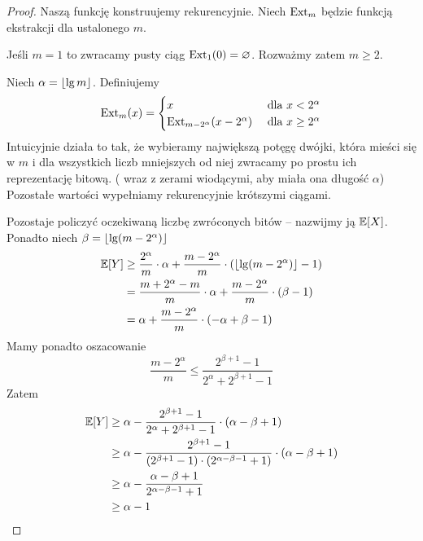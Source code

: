\begin{proof}
	Naszą funkcję konstruujemy rekurencyjnie. Niech \( \operatorname{Ext}_m \) będzie funkcją ekstrakcji dla ustalonego \( m \).

	Jeśli \( m = 1 \) to zwracamy pusty ciąg \( \operatorname{Ext}_1(0) = \varnothing \).
	Rozważmy zatem \( m \geq 2 \).

	Niech \( \alpha = \left\lfloor\lg m\right\rfloor \). Definiujemy
	\[
		\operatorname{Ext}_m(x) = \begin{cases}
			x                                 & \text{ dla } x < 2^\alpha    \\
			\operatorname{Ext}_{m - 2^\alpha}(x - 2^\alpha) & \text{ dla } x \geq 2^\alpha
		\end{cases}
	\]
	Intuicyjnie działa to tak, że wybieramy największą potęgę dwójki, która mieści się w \( m \)
	i dla wszystkich liczb mniejszych od niej zwracamy po prostu ich reprezentację bitową. (
	wraz z zerami wiodącymi, aby miała ona długość \( \alpha \))
	Pozostałe wartości wypełniamy rekurencyjnie krótszymi ciągami.

	Pozostaje policzyć oczekiwaną liczbę zwróconych bitów -- nazwijmy ją \( \expected{X} \).
	Ponadto niech \( \beta = \floor{\lg \pars{m - 2^\alpha}} \)
	\begin{align*}
		\expected{Y}
		 & \geq \frac{2^\alpha}{m} \cdot \alpha
		+ \frac{m - 2^\alpha}{m} \cdot \pars{\floor{\lg\pars{m - 2^\alpha}} - 1} \\
		 & =\frac{m + 2^\alpha - m}{m} \cdot \alpha
		+ \frac{m - 2^\alpha}{m} \cdot \pars{\beta - 1}                          \\
		 & = \alpha + \frac{m - 2^\alpha}{m} \cdot \pars{-\alpha + \beta - 1}    \\
	\end{align*}
	Mamy ponadto oszacowanie
	\[
		\frac{m - 2^\alpha}{m} \leq \frac{2^{\beta + 1} - 1}{2^\alpha + 2^{\beta + 1} - 1}
	\]
	Zatem
	\begin{align*}
		\expected{Y}
		 & \geq \alpha - \frac{2^{\beta + 1} - 1}{2^\alpha + 2^{\beta + 1} - 1} \cdot (\alpha - \beta + 1)                          \\
		 & \geq \alpha - \frac{2^{\beta + 1} - 1} {(2^{\beta + 1} - 1)\cdot(2^{\alpha - \beta - 1} + 1)} \cdot (\alpha - \beta + 1) \\
		 & \geq \alpha - \frac{\alpha - \beta + 1}{2^{\alpha - \beta - 1} + 1}                                                      \\
		 & \geq \alpha - 1
	\end{align*}
\end{proof}

